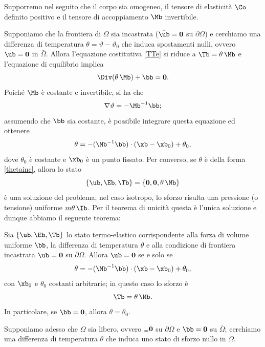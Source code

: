 Supporremo nel seguito che il corpo sia omogeneo, il tensore di elasticità $\Co$ definito positivo e il tensore di accoppiamento $\Mb$ invertibile.

Supponiamo che la frontiera di $\Omega$ sia incastrata ($\bar{\ub}=\mathbf{0}$ su $\partial\Omega$) e cerchiamo una differenza di temperatura $\theta=\vartheta-\vartheta_0$ che induca spostamenti nulli, ovvero $\ub=\mathbf{0}$ in $\bar{\Omega}$. Allora l'equazione costitutiva \eqref{TTe} si riduce a $\Tb=\theta\, \Mb$ e l'equazione di equilibrio implica
\begin{equation}
\Div(\theta\,\Mb)+\bb=\mathbf{0}.
\end{equation}
Poiché $\Mb$ è costante e  invertibile, si ha che
\begin{equation}
\nabla\vartheta=-\Mb^{-1}\bb;
\end{equation}
assumendo che $\bb$ sia costante, è possibile integrare questa equazione ed ottenere
\begin{equation}\label{thetainc}
\theta=-(\Mb^{-1}\bb)\cdot (\xb-\xb_0)+\theta_0,
\end{equation}
dove $\theta_0$ è costante e $\xb_0$ è un punto fissato. Per converso, se $\theta$ è della forma \eqref{thetainc}, allora lo stato
\begin{equation}
\{ \ub, \Eb, \Tb\}=\{\mathbf{0}, \mathbf{0}, \theta\,\Mb\}
\end{equation}
è una soluzione del problema; nel caso isotropo, lo sforzo risulta una pressione (o tensione) uniforme $m\theta\,\Ib$. Per il teorema di unicità questa è l'unica soluzione e dunque abbiamo il seguente teorema:
\begin{definition}
Sia $\{ \ub, \Eb, \Tb\}$ lo stato termo-elastico corrispondente alla forza di volume uniforme $\bb$, la differenza di temperatura $\theta$ e alla condizione di frontiera incastrata $\ub=\mathbf{0}$ su $\partial\Omega$. Allora $\ub=\mathbf{0}$ se e solo se
\begin{equation}
\theta=-(\Mb^{-1}\bb)\cdot (\xb-\xb_0)+\theta_0,
\end{equation}
con $\xb_0$ e $\theta_0$ costanti arbitrarie; in questo caso lo sforzo è
\begin{equation}
	\Tb=\theta\,\Mb.
\end{equation}
In particolare, se $\bb=\mathbf{0}$, allora $\theta=\theta_0$.
\end{definition}


Supponiamo adesso che $\Omega$ sia libero, ovvero $\sb =\mathbf{0}$ su $\partial{\Omega}$ e $\bb=\mathbf{0}$ su $\bar{\Omega}$; cerchiamo una differenza di temperatura $\theta$ che induca uno stato di sforzo nullo in $\Omega$.

